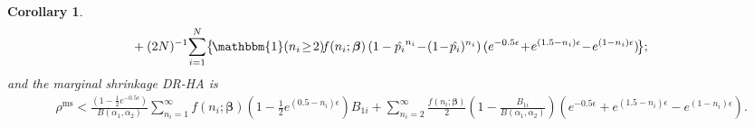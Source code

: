 \documentclass[10pt,journal,compsoc]{IEEEtran}
\newtheorem{cor}[thm]{\vspace{-6pt}\\ Corollary}
\newcommand{\bs}{\boldsymbol}
\begin{document}
\begin{cor}
\begin{align}
& +(2N)^{-1}\!\sum_{i=1}^N\!\big\{\! \mathbbm{1}(n_i\!\ge\!2)\!f(n_i;\bs\beta)\left(1-\hat{p_i}^{n_i}\!-\!(1\!-\!\hat{p_i})^{n_i}\right)(e^{-0.5\epsilon}\!+\!e^{(1.5-n_i)\epsilon}\!-\!e^{(1-n_i)\epsilon})\!\big\};\label{eqn:average.m}
\end{align}
and the marginal shrinkage DR-HA  is
\begin{align}
&\rho^{\text{ms}}\!<\!
\frac{(1\!-\!\frac{1}{2}e^{-0.5\epsilon})}{B(\alpha_1,\alpha_2)}\!\!\sum_{n_i=1}^{\infty}\!f(n_i;\bs\beta)\!\left(\!1\!-\!\frac{1}{2}e^{(0.5-n_i)\epsilon}\!\right)\!B_{1i}\!+\!\!\sum_{n_i=2}^{\infty}\!\frac{f(n_i;\bs\beta)}{2}\!\!\left(\!1\!-\!\frac{B_{1i}}{B(\alpha_1,\alpha_2)}\!\right)\!\! (e^{-0.5\epsilon}\!+\!e^{(1.5\!-\!n_i)\epsilon}\!-\!e^{(1\!-\!n_i)\epsilon}).\label{eqn:average.ms}
\end{align}
\end{cor}
\normalsize
\end{document}
